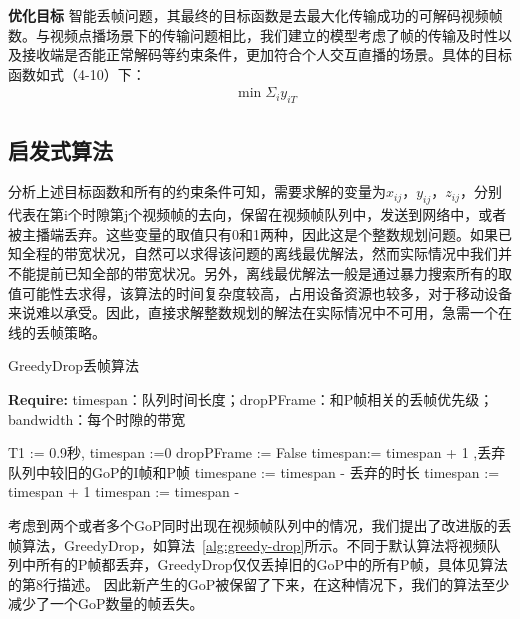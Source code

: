 \textbf{优化目标} 智能丢帧问题，其最终的目标函数是去最大化传输成功的可解码视频帧数。与视频点播场景下的传输问题相比，我们建立的模型考虑了帧的传输及时性以及接收端是否能正常解码等约束条件，更加符合个人交互直播的场景。具体的目标函数如式（4-10）下：
\begin{align}
  & \min \Sigma_i {y_{iT}}
\end{align}

\subsection{启发式算法}
分析上述目标函数和所有的约束条件可知，需要求解的变量为$x_{ij}$，$y_{ij}$，$z_{ij}$，分别代表在第i个时隙第j个视频帧的去向，保留在视频帧队列中，发送到网络中，或者被主播端丢弃。这些变量的取值只有0和1两种，因此这是个整数规划问题。如果已知全程的带宽状况，自然可以求得该问题的离线最优解法，然而实际情况中我们并不能提前已知全部的带宽状况。另外，离线最优解法一般是通过暴力搜索所有的取值可能性去求得，该算法的时间复杂度较高，占用设备资源也较多，对于移动设备来说难以承受。因此，直接求解整数规划的解法在实际情况中不可用，急需一个在线的丢帧策略。

\begin{algorithm}[htb]
\caption{GreedyDrop丢帧算法}
\label{alg:greedy-drop}
{\bf Require:} timespan：队列时间长度；dropPFrame：和P帧相关的丢帧优先级；bandwidth：每个时隙的带宽
\begin{algorithmic}[1]
\State T1 := 0.9秒, timespan :=0
\State dropPFrame := False
\State {}
\State timespan:= timespan + 1
\EndIf
{}
\State {},丢弃队列中较旧的GoP的I帧和P帧
\State timespane := timespan - 丢弃的时长
\Else
\State {}
\State timespan := timespan + 1
\EndIf
\EndIf
\State timespan := timespan - 
\end{algorithmic}
\end{algorithm}

考虑到两个或者多个GoP同时出现在视频帧队列中的情况，我们提出了改进版的丢帧算法，GreedyDrop，如算法~\ref{alg:greedy-drop}所示。不同于默认算法将视频队列中所有的P帧都丢弃，GreedyDrop仅仅丢掉旧的GoP中的所有P帧，具体见算法的第8行描述。 因此新产生的GoP被保留了下来，在这种情况下，我们的算法至少减少了一个GoP数量的帧丢失。

